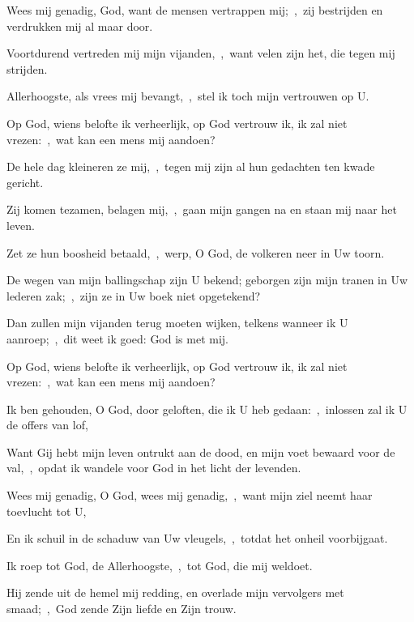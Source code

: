 \documentclass[12pt,twoside,a5paper]{article}
\begin{document}

\begin{halfparskip}
   Wees mij genadig, God, want de mensen vertrappen mij;~\sep\ zij bestrijden en verdrukken mij al maar door.


  Voortdurend vertreden mij mijn vijanden,~\sep\ want velen zijn het, die tegen mij strijden.

  Allerhoogste, als vrees mij bevangt,~\sep\ stel ik toch mijn vertrouwen op U.

  Op God, wiens belofte ik verheerlijk, op God vertrouw ik, ik zal niet vrezen:~\sep\ wat kan een mens mij aandoen?

  De hele dag kleineren ze mij,~\sep\ tegen mij zijn al hun gedachten ten kwade gericht.

  Zij komen tezamen, belagen mij,~\sep\ gaan mijn gangen na en staan mij naar het leven.

  Zet ze hun boosheid betaald,~\sep\ werp, O God, de volkeren neer in Uw toorn.

  De wegen van mijn ballingschap zijn U bekend; geborgen zijn mijn tranen in Uw lederen zak;~\sep\ zijn ze in Uw boek niet opgetekend?

  Dan zullen mijn vijanden terug moeten wijken, telkens wanneer ik U aanroep;~\sep\ dit weet ik goed: God is met mij.

  Op God, wiens belofte ik verheerlijk, op God vertrouw ik, ik zal niet vrezen:~\sep\ wat kan een mens mij aandoen?

  Ik ben gehouden, O God, door geloften, die ik U heb gedaan:~\sep\ inlossen zal ik U de offers van lof,

  Want Gij hebt mijn leven ontrukt aan de dood, en mijn voet bewaard voor de val,~\sep\ opdat ik wandele voor God in het licht der levenden.

   Wees mij genadig, O God, wees mij genadig,~\sep\ want mijn ziel neemt haar toevlucht tot U,

  En ik schuil in de schaduw van Uw vleugels,~\sep\ totdat het onheil voorbijgaat.

  Ik roep tot God, de Allerhoogste,~\sep\ tot God, die mij weldoet.

  Hij zende uit de hemel mij redding, en overlade mijn vervolgers met smaad;~\sep\ God zende Zijn liefde en Zijn trouw.


\end{halfparskip}
\end{document}

